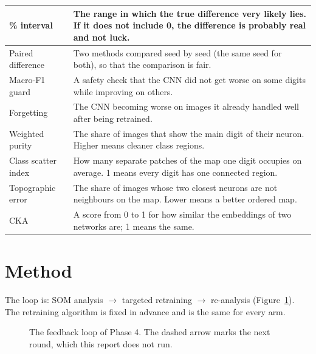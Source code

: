 \documentclass[11pt]{article}
\begin{document}
{\begin{tabularx}{\textwidth}{|>{\raggedright\arraybackslash}p{}|X|}
95\% interval & The range in which the true difference very likely lies. If it does not include 0, the difference is probably real and not luck. \\ \hline
Paired difference & Two methods compared seed by seed (the same seed for both), so that the comparison is fair. \\ \hline
Macro-F1 guard & A safety check that the CNN did not get worse on some digits while improving on others. \\ \hline
Forgetting & The CNN becoming worse on images it already handled well after being retrained. \\ \hline
Weighted purity & The share of images that show the main digit of their neuron. Higher means cleaner class regions. \\ \hline
Class scatter index & How many separate patches of the map one digit occupies on average. 1 means every digit has one connected region. \\ \hline
Topographic error & The share of images whose two closest neurons are not neighbours on the map. Lower means a better ordered map. \\ \hline
CKA & A score from 0 to 1 for how similar the embeddings of two networks are; 1 means the same. \\ \hline
\end{tabularx}}

\section{Method}\label{sec:method}

The loop is: SOM analysis $\rightarrow$ targeted retraining $\rightarrow$ re-analysis (Figure~\ref{fig:loop}). The retraining algorithm is fixed in advance and is the same for every arm.

\begin{figure}[H]
\centering
{}
\caption{The feedback loop of Phase 4. The dashed arrow marks the next round, which this report does not run.}
\label{fig:loop}
\end{figure}
\end{document}
